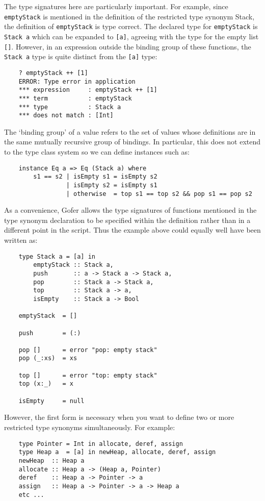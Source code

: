 The type signatures here are particularly important.  For example,
since \verb"emptyStack" is mentioned in the definition of the restricted type
synonym Stack, the definition of \verb"emptyStack" is type correct.  The
declared type for \verb"emptyStack" is \verb"Stack a" which can be expanded to \verb"[a]",
agreeing with the type for the empty list \verb"[]".  However, in an expression
outside the binding group of these functions, the \verb"Stack a" type is quite
distinct from the \verb"[a]" type:
\begin{verbatim}
    ? emptyStack ++ [1]
    ERROR: Type error in application
    *** expression     : emptyStack ++ [1]
    *** term           : emptyStack
    *** type           : Stack a
    *** does not match : [Int]
\end{verbatim}
The `binding group' of a value refers to the set of values whose
definitions are in the same mutually recursive group of bindings.  In
particular, this does not extend to the type class system so we can
define instances such as:
\begin{verbatim}
    instance Eq a => Eq (Stack a) where
        s1 == s2 | isEmpty s1 = isEmpty s2
                 | isEmpty s2 = isEmpty s1
                 | otherwise  = top s1 == top s2 && pop s1 == pop s2
\end{verbatim}
As a convenience, Gofer allows the type signatures of functions
mentioned in the type synonym declaration to be specified within the
definition rather than in a different point in the script.  Thus the
example above could equally well have been written as:
\begin{verbatim}
    type Stack a = [a] in
        emptyStack :: Stack a,
        push       :: a -> Stack a -> Stack a,
        pop        :: Stack a -> Stack a,
        top        :: Stack a -> a,
        isEmpty    :: Stack a -> Bool

    emptyStack  = []

    push        = (:)

    pop []      = error "pop: empty stack"
    pop (_:xs)  = xs

    top []      = error "top: empty stack"
    top (x:_)   = x

    isEmpty     = null
\end{verbatim}
However, the first form is necessary when you want to define two or
more restricted type synonyms simultaneously.  For example:
\begin{verbatim}
    type Pointer = Int in allocate, deref, assign
    type Heap a  = [a] in newHeap, allocate, deref, assign
    newHeap  :: Heap a
    allocate :: Heap a -> (Heap a, Pointer)
    deref    :: Heap a -> Pointer -> a
    assign   :: Heap a -> Pointer -> a -> Heap a
    etc ...
\end{verbatim}
